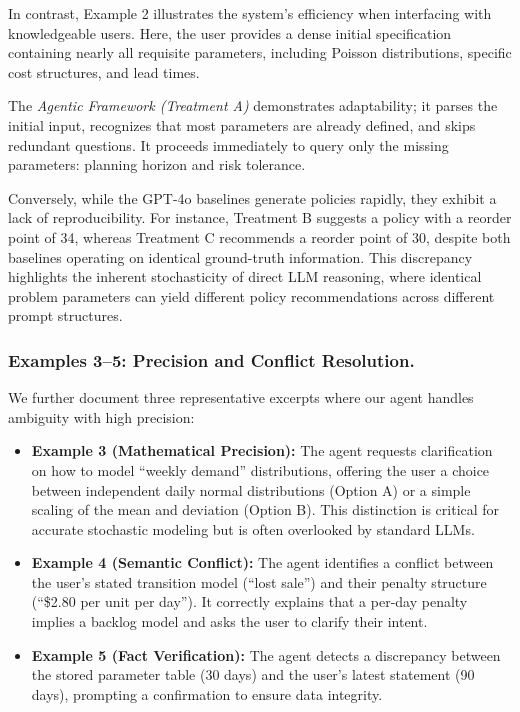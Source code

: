 In contrast, Example 2 illustrates the system's efficiency when interfacing with knowledgeable users. Here, the user provides a dense initial specification containing nearly all requisite parameters, including Poisson distributions, specific cost structures, and lead times.


The \textit{Agentic Framework (Treatment A)} demonstrates adaptability; it parses the initial input, recognizes that most parameters are already defined, and skips redundant questions. It proceeds immediately to query only the missing parameters: planning horizon and risk tolerance.

Conversely, while the GPT-4o baselines generate policies rapidly, they exhibit a lack of reproducibility. For instance, Treatment B suggests a policy with a reorder point of 34, whereas Treatment C recommends a reorder point of 30, despite both baselines operating on identical ground-truth information. This discrepancy highlights the inherent stochasticity of direct LLM reasoning, where identical problem parameters can yield different policy recommendations across different prompt structures.

\subsubsection{Examples 3--5: Precision and Conflict Resolution.}
We further document three representative excerpts where our agent handles ambiguity with high precision:
\begin{itemize}
    \item \textbf{Example 3 (Mathematical Precision):} The agent requests clarification on how to model ``weekly demand'' distributions, offering the user a choice between independent daily normal distributions (Option A) or a simple scaling of the mean and deviation (Option B). This distinction is critical for accurate stochastic modeling but is often overlooked by standard LLMs.
    \item \textbf{Example 4 (Semantic Conflict):} The agent identifies a conflict between the user's stated transition model (``lost sale'') and their penalty structure (``\$2.80 per unit per day''). It correctly explains that a per-day penalty implies a backlog model and asks the user to clarify their intent.
    \item \textbf{Example 5 (Fact Verification):} The agent detects a discrepancy between the stored parameter table (30 days) and the user's latest statement (90 days), prompting a confirmation to ensure data integrity.
\end{itemize}



